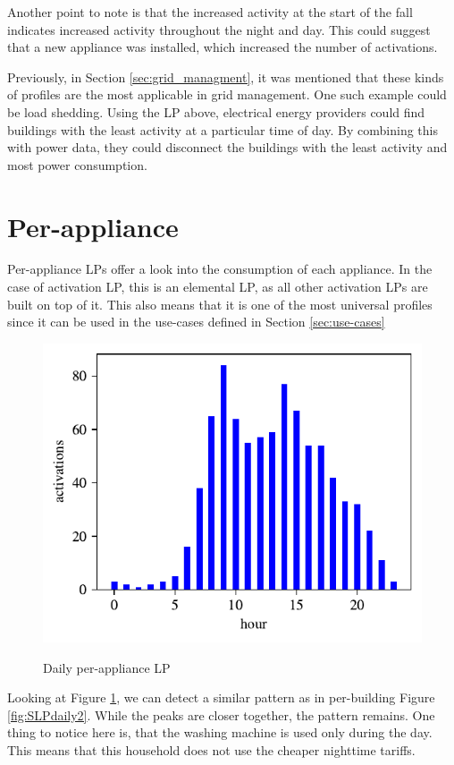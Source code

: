Another point to note is that the increased activity at the start of the fall indicates increased activity throughout the night and day.
This could suggest that a new appliance was installed, which increased the number of activations.

Previously, in Section \ref{sec:grid_managment}, it was mentioned that these kinds of profiles are the most applicable in grid management. 
One such example could be load shedding.
Using the LP above, electrical energy providers could find buildings with the least activity at a particular time of day.
By combining this with power data, they could disconnect the buildings with the least activity and most power consumption.

\section{Per-appliance}

Per-appliance LPs offer a look into the consumption of each appliance. 
In the case of activation LP, this is an elemental LP, as all other activation LPs are built on top of it. 
This also means that it is one of the most universal profiles since it can be used in the use-cases defined in Section \ref{sec:use-cases}

\begin{figure}[H]
	\centering
	\caption{Daily per-appliance LP}
	\includegraphics[]{../Figures/LPS/WM_daily.pdf}
	\label{fig:WM_daily}
\end{figure}

Looking at Figure \ref{fig:WM_daily}, we can detect a similar pattern as in per-building Figure \ref{fig:SLPdaily2}. 
While the peaks are closer together, the pattern remains.
One thing to notice here is, that the washing machine is used only during the day.
This means that this household does not use the cheaper nighttime tariffs.

